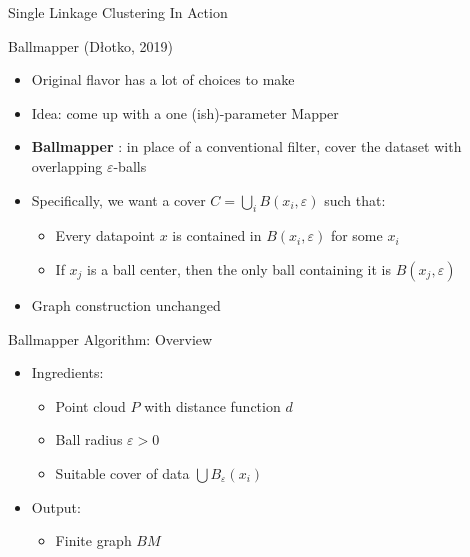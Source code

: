 \documentclass{beamer}
\begin{document}
\begin{frame}{Single Linkage Clustering In Action}
{\begin{figure}[!h]
\begin{subfigure}{.4\linewidth}
      \end{subfigure}
      \end{figure}}
\end{frame}

\begin{frame}{Ballmapper (Dłotko, 2019)}
  \begin{itemize}
    \item Original flavor has a lot of choices to make
    \item Idea: come up with a one (ish)-parameter Mapper
    \item \textbf{Ballmapper} \cite{ballmapper}: in place of a conventional filter, cover the dataset with overlapping $\varepsilon$-balls
    \item Specifically, we want a cover $C = \bigcup_i B(x_i, \varepsilon)$ such that:
    \begin{itemize}
      \item Every datapoint $x$ is contained in $B(x_i, \varepsilon)$ for some $x_i$
      \item If $x_j$ is a ball center, then the only ball containing it is $B(x_j, \varepsilon)$
    \end{itemize}
    \item Graph construction unchanged
  \end{itemize}
  
\end{frame}

\begin{frame}{Ballmapper Algorithm: Overview}
  \begin{itemize}
    \item Ingredients:
    \begin{itemize}
      \item Point cloud $P$ with distance function $d$
      \item Ball radius $\varepsilon > 0$
      \item Suitable cover of data $\bigcup B_\varepsilon(x_i)$
    \end{itemize}
    \item Output:
    \begin{itemize}
      \item Finite graph $BM$
    \end{itemize}
  \end{itemize}
\end{frame}
\end{document}
